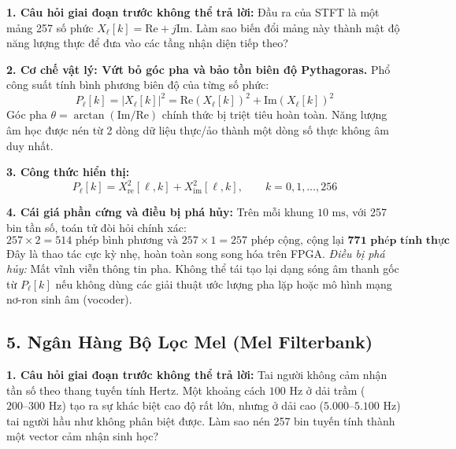 \documentclass[11pt,a4paper]{article}
\begin{document}
\textbf{1. Câu hỏi giai đoạn trước không thể trả lời:} Đầu ra của STFT là một mảng 257 số phức $X_\ell[k] = \text{Re} + j\text{Im}$. Làm sao biến đổi mảng này thành mật độ năng lượng thực để đưa vào các tầng nhận diện tiếp theo?

\textbf{2. Cơ chế vật lý: Vứt bỏ góc pha và bảo tồn biên độ Pythagoras.} Phổ công suất tính bình phương biên độ của từng số phức:
\[
P_\ell[k] = |X_\ell[k]|^2 = \text{Re}(X_\ell[k])^2 + \text{Im}(X_\ell[k])^2
\]
Góc pha $\theta = \arctan(\text{Im}/\text{Re})$ chính thức bị triệt tiêu hoàn toàn. Năng lượng âm học được nén từ 2 dòng dữ liệu thực/ảo thành một dòng số thực không âm duy nhất.

\textbf{3. Công thức hiển thị:}
\[
P_\ell[k] = X_{\text{re}}^2[\ell, k] + X_{\text{im}}^2[\ell, k], \qquad k = 0, 1, \dots, 256
\]

\textbf{4. Cái giá phần cứng và điều bị phá hủy:} Trên mỗi khung $10\text{ ms}$, với 257 bin tần số, toán tử đòi hỏi chính xác:
\[
257 \times 2 = 514\text{ phép bình phương và } 257 \times 1 = 257\text{ phép cộng, cộng lại } \mathbf{771\text{ phép tính thực}}
\]
Đây là thao tác cực kỳ nhẹ, hoàn toàn song song hóa trên FPGA. \textit{Điều bị phá hủy:} Mất vĩnh viễn thông tin pha. Không thể tái tạo lại dạng sóng âm thanh gốc từ $P_\ell[k]$ nếu không dùng các giải thuật ước lượng pha lặp hoặc mô hình mạng nơ-ron sinh âm (vocoder).

\subsection*{5. Ngân Hàng Bộ Lọc Mel (Mel Filterbank)}

\textbf{1. Câu hỏi giai đoạn trước không thể trả lời:} Tai người không cảm nhận tần số theo thang tuyến tính Hertz. Một khoảng cách $100\text{ Hz}$ ở dải trầm ($200\text{--}300\text{ Hz}$) tạo ra sự khác biệt cao độ rất lớn, nhưng ở dải cao ($5.000\text{--}5.100\text{ Hz}$) tai người hầu như không phân biệt được. Làm sao nén 257 bin tuyến tính thành một vector cảm nhận sinh học?
\end{document}
